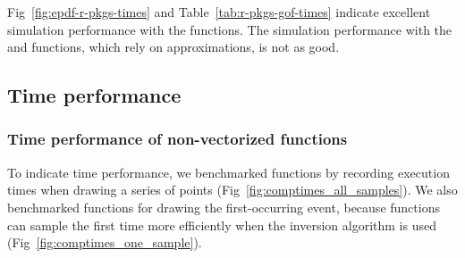 \documentclass[article,nojss]{jss}\usepackage[]{graphicx}\usepackage[]{xcolor}
\begin{document}
Fig~\ref{fig:epdf-r-pkgs-times} and Table~\ref{tab:r-pkgs-gof-times} indicate excellent simulation performance with the  functions. The simulation performance with the  and  functions, which rely on approximations, is not as good.

\begin{table}[ht!]
\caption{\textbf{Goodness of fit of simulated event times with  functions in Table~\ref{tab:R-packages}.}}
\vspace{5pt}
\label{tab:r-pkgs-gof-times}
\centering
{}
\end{table}



\subsection{Time performance}\label{sec:example-time-performance}

\subsubsection{Time performance of non-vectorized functions}\label{sec:nonvectorized-functions}

To indicate time performance, we benchmarked functions by recording execution times when drawing a series of points (Fig~\ref{fig:comptimes_all_samples}). We also benchmarked functions for drawing the first-occurring event, because  functions can sample the first time more efficiently when the inversion algorithm is used (Fig~\ref{fig:comptimes_one_sample}).
\end{document}
